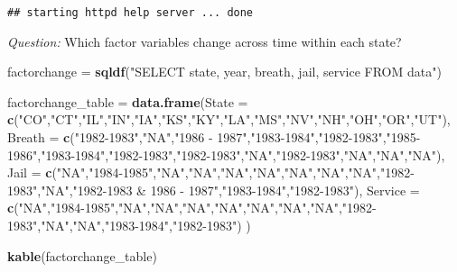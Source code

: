 \documentclass[]{article}
\newenvironment{Shaded}{\begin{snugshade}}{\end{snugshade}}
\newcommand{\DataTypeTok}[1]{\textcolor[rgb]{0.13,0.29,0.53}{#1}}
\newcommand{\KeywordTok}[1]{\textcolor[rgb]{0.13,0.29,0.53}{\textbf{#1}}}
\newcommand{\NormalTok}[1]{#1}
\newcommand{\StringTok}[1]{\textcolor[rgb]{0.31,0.60,0.02}{#1}}
\begin{document}
\begin{verbatim}
## starting httpd help server ... done
\end{verbatim}

\emph{Question:} Which factor variables change across time within each state?

\begin{Shaded}
\begin{Highlighting}[]
\NormalTok{factorchange =}\StringTok{ }\KeywordTok{sqldf}\NormalTok{(}\StringTok{"SELECT state, year, breath, jail, service FROM data"}\NormalTok{)}

\NormalTok{factorchange_table =}\StringTok{ }\KeywordTok{data.frame}\NormalTok{(}\DataTypeTok{State =} \KeywordTok{c}\NormalTok{(}\StringTok{"CO"}\NormalTok{,}\StringTok{"CT"}\NormalTok{,}\StringTok{"IL"}\NormalTok{,}\StringTok{"IN"}\NormalTok{,}\StringTok{"IA"}\NormalTok{,}\StringTok{"KS"}\NormalTok{,}\StringTok{"KY"}\NormalTok{,}\StringTok{"LA"}\NormalTok{,}\StringTok{"MS"}\NormalTok{,}\StringTok{"NV"}\NormalTok{,}\StringTok{"NH"}\NormalTok{,}\StringTok{"OH"}\NormalTok{,}\StringTok{"OR"}\NormalTok{,}\StringTok{"UT"}\NormalTok{),}
                                \DataTypeTok{Breath =} \KeywordTok{c}\NormalTok{(}\StringTok{"1982-1983"}\NormalTok{,}\StringTok{"NA"}\NormalTok{,}\StringTok{"1986 - 1987"}\NormalTok{,}\StringTok{"1983-1984"}\NormalTok{,}\StringTok{"1982-1983"}\NormalTok{,}\StringTok{"1985-1986"}\NormalTok{,}\StringTok{"1983-1984"}\NormalTok{,}\StringTok{"1982-1983"}\NormalTok{,}\StringTok{"1982-1983"}\NormalTok{,}\StringTok{"NA"}\NormalTok{,}\StringTok{"1982-1983"}\NormalTok{,}\StringTok{"NA"}\NormalTok{,}\StringTok{"NA"}\NormalTok{,}\StringTok{"NA"}\NormalTok{),}
                                \DataTypeTok{Jail =} \KeywordTok{c}\NormalTok{(}\StringTok{"NA"}\NormalTok{,}\StringTok{"1984-1985"}\NormalTok{,}\StringTok{"NA"}\NormalTok{,}\StringTok{"NA"}\NormalTok{,}\StringTok{"NA"}\NormalTok{,}\StringTok{"NA"}\NormalTok{,}\StringTok{"NA"}\NormalTok{,}\StringTok{"NA"}\NormalTok{,}\StringTok{"NA"}\NormalTok{,}\StringTok{"1982-1983"}\NormalTok{,}\StringTok{"NA"}\NormalTok{,}\StringTok{"1982-1983 & 1986 - 1987"}\NormalTok{,}\StringTok{"1983-1984"}\NormalTok{,}\StringTok{"1982-1983"}\NormalTok{),}
                                \DataTypeTok{Service =} \KeywordTok{c}\NormalTok{(}\StringTok{"NA"}\NormalTok{,}\StringTok{"1984-1985"}\NormalTok{,}\StringTok{"NA"}\NormalTok{,}\StringTok{"NA"}\NormalTok{,}\StringTok{"NA"}\NormalTok{,}\StringTok{"NA"}\NormalTok{,}\StringTok{"NA"}\NormalTok{,}\StringTok{"NA"}\NormalTok{,}\StringTok{"NA"}\NormalTok{,}\StringTok{"1982-1983"}\NormalTok{,}\StringTok{"NA"}\NormalTok{,}\StringTok{"NA"}\NormalTok{,}\StringTok{"1983-1984"}\NormalTok{,}\StringTok{"1982-1983"}\NormalTok{)}
\NormalTok{                                )}

\KeywordTok{kable}\NormalTok{(factorchange_table)}
\end{Highlighting}
\end{Shaded}
\end{document}
